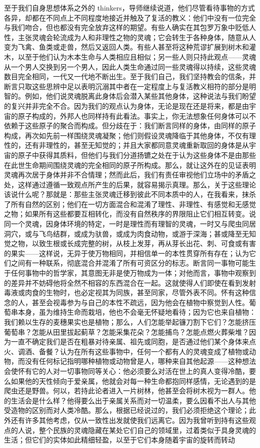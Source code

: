 至于我们自身思想体系之外的 thinkers，导师继续说道，他们尽管看待事物的方式各异，却都在不同点上不同程度地接近并触及了复活的教义：他们中没有一位完全与我们吻合，但也都没有完全放弃这样的期望。有些人确实在其包罗万象中贬低人性，主张灵魂会轮流成为人和非理性之物的灵魂；它会转生于各种身体，随意从人变为飞禽、鱼类或走兽，然后又返回人类。有些人甚至将这种荒谬扩展到树木和灌木，以至于他们认为木本生命与人类相应且相似；另一些人则只持此观点——灵魂从一个男人交换到另一个男人，因此人类生命通过同一些灵魂得以持续，这些灵魂数目完全相同，一代又一代地不断出生。至于我们自己，我们坚持教会的信条，并断言只取这些思辨中足以表明沉溺其中者在一定程度上与复活教义相符的部分是明智的。例如，他们说灵魂脱离此身体后会潜入某些其他身体，这种说法与我们盼望的复兴并非完全不合。因为我们的观点认为身体，无论是现在还是将来，都是由宇宙的原子构成的，外邦人也同样持有此看法。事实上，你无法想象任何身体可以不依赖于这些原子的聚合而构成。但分歧在于：我们断言同样的身体，由同样的原子构成，再次如先前一样围绕灵魂凝聚；他们则假设灵魂降临于其他身体，不仅有理性的，还有非理性的，甚至无知觉的；并且大家都同意灵魂重新取回的身体是从宇宙的原子中获得其质料，但他们与我们分道扬镳之处在于认为这些身体不是由那些在此世生命期间围绕灵魂的完全相同的原子所构成。那么，就让这外在的见证表明灵魂再次居于身体并非不合情理；然而此后，我们有责任审视他们立场中的矛盾之处，这样通过遵循一致观点所产生的后果，就容易揭示真理。那么，关于这些理论该说什么呢？那就是：那些主张灵魂迁移到彼此不同本质中的人，在我看来，抹杀了所有自然的区别；他们在一切方面混合和混淆了理性、非理性、有感觉和无感觉之物；如果所有这些都要互相转化，而没有自然秩序的界限阻止它们相互转变。说同一个灵魂，因身体环境的特定，一时是理性而有理智的灵魂，一时又与爬虫同居洞穴，或与飞鸟结群，或成为驮兽，或成为肉食动物，或游于深海；甚或降至无知觉之物，以致生根或长成完整的树，从枝上发芽，再从芽长出花、刺、可食或有害的果实——这样说，无异于使万物相同，并相信单一的本性贯穿所有存在；认为它们之间有一种联系，彻底混合并混淆了所有可资区分的标志。断言同一事物可能生于任何事物中的哲学家，其意图无非是使万物成为一体；对他而言，事物中观察到的差异并不妨碍他将全然不相容的东西混合在一起。这就使得人们即使在看到发射毒液或肉食的生物时，也必定视其为同族，甚至同家，尽管外表不同。怀有这种信念的人，甚至会视毒参为与自己的本性不疏远，因为他会在植物中察觉到人性。葡萄串本身，虽为维持生命而栽培，他也不会毫无怀疑地看待；因为它也来自植物：我们赖以生存的麦穗果实也是植物；那么，人们怎能举起镰刀割下它们？怎能挤压葡萄串？怎能从田里拔起蓟草？怎能采集花朵？怎能捕鸟？怎能点燃火葬柴堆？因为一直不确定我们是否在粗暴对待亲属、祖先或同胞，是否通过他们某个身体来点火、调酒、备餐？认为在所有这些事物中，任何一个都有人的灵魂变成了植物或动物，而没有任何标记指明哪种植物或动物曾是人，哪种来自其他起源——这种想法会使怀有它的人对一切事物同等关心：他必须要么对活在世上的真人变得冷酷，要么如果他的天性倾向于爱亲属，他就会对每一种生命都抱同样感情，无论遇到的是爬虫还是野兽。何以，若持此论者进入一片树林，他甚至会将树木视为一群人。他的生活会是什么样？他得要么出于亲属关系而对一切温柔，要么因看不出人与其他受造物的区别而对人类冷酷。那么，根据已经说过的，我们必须拒绝这个理论；此外还有许多其他考虑，仅从一致性出发就使我们远离它。因为我曾听到持有这些观点的人说，整个民族的灵魂隐藏在某处它们自己的领域里，过着类似于具身灵魂的生活；但它们的实体如此精细轻盈，以至于它们本身随着宇宙的旋转而转动